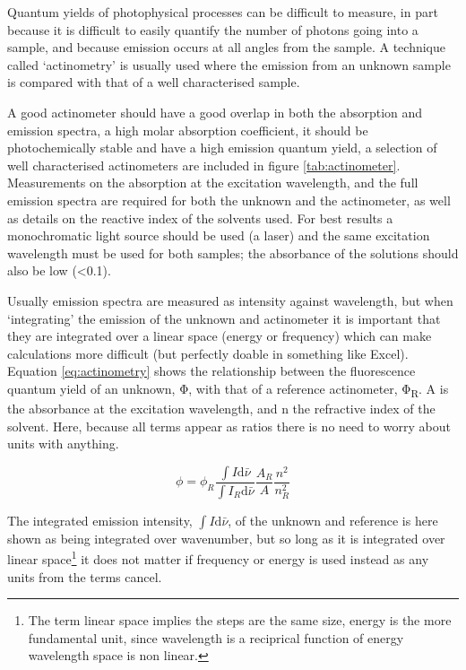 \documentclass[
]{book}
\begin{document}
Quantum yields of photophysical processes can be difficult to measure, in part because it is difficult to easily quantify the number of photons going into a sample, and because emission occurs at all angles from the sample. A technique called `actinometry' is usually used where the emission from an unknown sample is compared with that of a well characterised sample.

A good actinometer should have a good overlap in both the absorption and emission spectra, a high molar absorption coefficient, it should be photochemically stable and have a high emission quantum yield, a selection of well characterised actinometers are included in figure \ref{tab:actinometer}. Measurements on the absorption at the excitation wavelength, and the full emission spectra are required for both the unknown and the actinometer, as well as details on the reactive index of the solvents used. For best results a monochromatic light source should be used (a laser) and the same excitation wavelength must be used for both samples; the absorbance of the solutions should also be low (\textless0.1).

Usually emission spectra are measured as intensity against wavelength, but when `integrating' the emission of the unknown and actinometer it is important that they are integrated over a linear space (energy or frequency) which can make calculations more difficult (but perfectly doable in something like Excel). Equation \eqref{eq:actinometry} shows the relationship between the fluorescence quantum yield of an unknown, Φ, with that of a reference actinometer, Φ\textsubscript{R}. A is the absorbance at the excitation wavelength, and n the refractive index of the solvent. Here, because all terms appear as ratios there is no need to worry about units with anything.

\begin{equation}
\phi=\phi_R \frac{\int{I}\textrm{d}\bar \nu}{\int{I_R}\textrm{d}\bar \nu}\frac{A_R}{A}\frac{n^2}{n^2_R}
\label{eq:actinometry}
\end{equation}

The integrated emission intensity, \(\int{I}\textrm{d}\bar \nu\), of the unknown and reference is here shown as being integrated over wavenumber, but so long as it is integrated over linear space\footnote{The term linear space implies the steps are the same size, energy is the more fundamental unit, since wavelength is a reciprical function of energy wavelength space is non linear.} it does not matter if frequency or energy is used instead as any units from the terms cancel.
\end{document}
